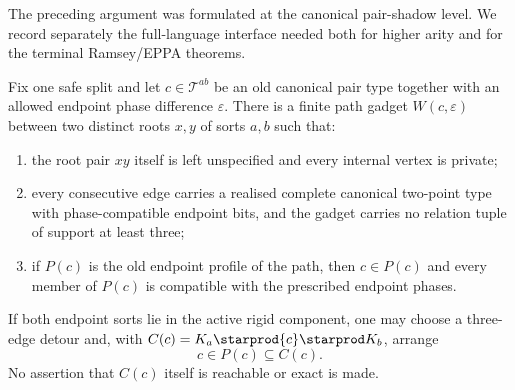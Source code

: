 The preceding argument was formulated at the canonical pair-shadow level.  We
record separately the full-language interface needed both for higher arity and
for the terminal Ramsey/EPPA theorems.

\begin{lemma}
\label{lem:root-free-phase-safe}
Fix one safe split and let $c\in\mathcal T^{ab}$ be an old canonical pair
type together with an allowed endpoint phase difference $\varepsilon$.
There is a finite path gadget $W(c,\varepsilon)$ between two distinct roots
$x,y$ of sorts $a,b$ such that:
\begin{enumerate}[label=(\roman*)]
\item the root pair $xy$ itself is left unspecified and every internal vertex
      is private;
\item every consecutive edge carries a realised complete canonical
      two-point type with phase-compatible endpoint bits, and the gadget
      carries no relation tuple of support at least three;
\item if $P(c)$ is the old endpoint profile of the path, then
      $c\in P(c)$ and every member of $P(c)$ is compatible with the prescribed
      endpoint phases.
\end{enumerate}
If both endpoint sorts lie in the active rigid component, one may choose a
three-edge detour and, with
$C(c)=K_a\starprod\{c\}\starprod K_b$, arrange
\[
        c\in P(c)\subseteq C(c).
\]
No assertion that $C(c)$ itself is reachable or exact is made.
\end{lemma}

